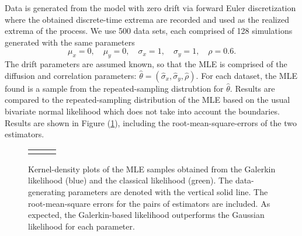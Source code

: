 Data is generated from the model with zero drift via forward
Euler discretization where the obtained discrete-time extrema are
recorded and used as the realized extrema of the process. We use 500
data sets, each comprised of 128 simulations generated with the same
parameters
\[
  \mu_x = 0,\quad \mu_y  = 0,\quad \sigma_x = 1,\quad \sigma_y = 1,\quad \rho = 0.6.
\]
The drift parameters are assumed known, so that the MLE is comprised
of the diffusion and correlation parameters:
$\hat{\theta} = (\hat{\sigma}_x, \hat{\sigma}_y, \hat{\rho}).$ For
each dataset, the MLE found is a sample from the repeated-sampling
distrubtion for $\hat{\theta}$. Results are compared to the
repeated-sampling distribution of the MLE based on the usual bivariate
normal likelihood which does not take into account the
boundaries. Results are shown in Figure (\ref{fig:mle-comparison}),
including the root-mean-square-errors of the two estimators.

\begin{figure}
  \centering
  \begin{tabular}{ccc}
    \begin{minipage}{0.3\textwidth}
      \centering
    \end{minipage}
    & \begin{minipage}{0.3\textwidth}
      \centering
    \end{minipage}
    & \begin{minipage}{0.3\textwidth}
      \centering
    \end{minipage}
  \end{tabular}
  \caption{Kernel-density plots of the MLE samples obtained from the
    Galerkin likelihood (blue) and the classical likelihood
    (green). The data-generating parameters are denoted with the
    vertical solid line. The root-mean-square errors for the pairs of
    estimators are included. As expected, the Galerkin-based
    likelihood outperforms the Gaussian likelihood for each
    parameter.}
  \label{fig:mle-comparison}
\end{figure}
